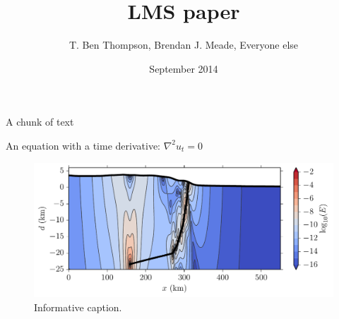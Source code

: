 \documentclass{article}
\title{LMS paper}
\author{T. Ben Thompson, Brendan J. Meade, Everyone else}
\date{September 2014}
\begin{document}
\maketitle

A chunk of text

An equation with a time derivative:
$\nabla^2 u_t = 0$

\begin{figure}[h!]
  \centering
     \includegraphics[width=5in]{figs/log_energy_density.pdf}
   \caption{Informative caption.}
\end{figure}
\end{document}
